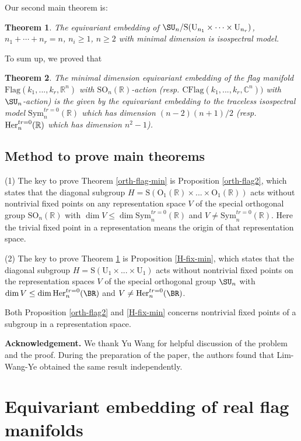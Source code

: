 \documentclass[a4paper]{amsart}
\newcommand{\RS}{{\mathrm {S}}} \newcommand{\RT}{{\mathrm {T}}}
\newcommand{\RU}{{\mathrm {U}}} \newcommand{\RV}{{\mathrm {V}}}
\newcommand{\Flag}{\mathrm{Flag}}
\newcommand{\CFlag}{\mathrm{CFlag}}
\newcommand{\SO}{{\mathrm{SO}}}\newcommand{\so}{\mathfrak{so}}
\newcommand{\Sym}{{\mathrm{Sym}}}\newcommand{\sgn}{{\mathrm{sgn}}}
\theoremstyle{plain}
\newtheorem{thm}{Theorem}[section] \newtheorem{cor}[thm]{Corollary}
\theoremstyle{remark} \newtheorem{remark}[thm]{Remark}
\theoremstyle{remark} \newtheorem{exercise}{Exercise}
\theoremstyle{remark} \newtheorem{example}{Example}
\numberwithin{equation}{section}
\begin{document}
Our second main theorem is:
\begin{thm}\label{uni-min-equi}
    The equivariant embedding of $\SU_n/\RS(\RU_{n_1}\times\cdots\times\RU_{n_r})$, $n_1+\cdots+n_r=n$, $n_i\geqslant 1$, $n\geqslant 2$ with minimal dimension is isospectral model.
\end{thm}
To sum up, we proved that
\begin{thm}
The minimal dimension equivariant embedding of the flag manifold $\Flag(k_1,...,k_r,\mathbb{R}^n)$ with $\SO_n(\mathbb{R})$-action (resp. $\CFlag(k_1,...,k_r,\mathbb{C}^n))$ with $\SU_n$-action) is the given by the equivariant embedding to the traceless isospectral model $\Sym_n^{tr=0}(\mathbb{R})$ which has dimension $(n-2)(n+1)/2$ (resp. ${\rm Her}_n^{tr=0}(\mathbb{R})$ which has dimension $n^2-1$).
\end{thm}

\subsection{Method to prove main theorems}

(1) The key to prove Theorem \ref{orth-flag-min} is Proposition \ref{orth-flag2}, which states that the diagonal subgroup $H=\text{S}(\text{O}_1(\mathbb{R})\times...\times \text{O}_1(\mathbb{R}))$ acts without nontrivial fixed points on any representation space $V$ of the special orthogonal group $\SO_n(\mathbb{R})$ with $\dim V\le \dim\Sym_n^{tr=0}(\mathbb{R})$ and $V\ne\Sym_n^{tr=0}(\mathbb{R})$.
Here the trivial fixed point in a representation means the origin of that representation space.

(2) The key to prove Theorem \ref{uni-min-equi} is Proposition \ref{H-fix-min}, which states that the diagonal subgroup $H=\RS(\RU_1\times...\times \RU_1)$ acts without nontrivial fixed points on the representation spaces $V$ of the special orthogonal group $\SU_n$ with $\dim V\le\dim \mathrm{Her}_n^{tr=0}(\BR)$ and $V\ne\mathrm{Her}_n^{tr=0}(\BR)$.

Both Proposition \ref{orth-flag2} and \ref{H-fix-min} concerns nontrivial fixed points of a subgroup in a representation space.

{\bf Acknowledgement.} We thank Yu Wang for helpful discussion of the problem and the proof. During the preparation of the paper, the authors found that Lim-Wang-Ye \cite{WLY} obtained the same result independently.


\section{Equivariant embedding of real flag manifolds}
\end{document}
